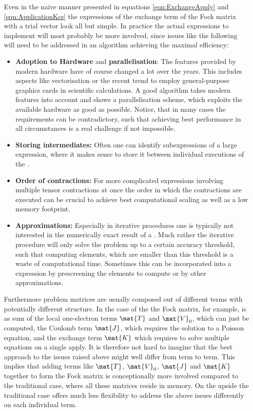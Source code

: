 Even in the naive manner presented
in equations \eqref{eqn:ExchangeApply} and \eqref{eqn:ApplicationKcs}
the \contraction expressions
of the exchange term of the Fock matrix with a trial vector
look all but simple.
In practice the actual expressions to implement
will most probably be more involved,
since issues like the following will need to be addressed
in an algorithm achieving the maximal efficiency:
\begin{itemize}
	\item \textbf{Adoption to Hardware} and \textbf{parallelisation}:
		The features provided by modern hardware
		have of course changed a lot over the years.
		This includes aspects like vectorisation
		or the recent trend to employ general-purpose graphics cards
		in scientific calculations.
		A good algorithm takes modern features into account
		and shows a parallelisation scheme,
		which exploits the available hardware as good as possible.
		Notice, that in many cases the requirements
		can be contradictory,
		such that achieving best performance in all circumstances
		is a real challenge if not impossible.
	\item \textbf{Storing intermediates:}
		Often one can identify subexpressions
		of a large \contraction expression,
		where it makes sense to store it between individual
		executions of the \contraction.
	\item \textbf{Order of contractions:}
		For more complicated expressions involving
		multiple tensor contractions at once the order
		in which the contractions are executed can be crucial
		to achieve best computational scaling
		as well as a low memory footprint.
	\item \textbf{Approximations:}
		Especially in iterative procedures one is typically not
		interested in the numerically exact result
		of a \contraction.
		Much rather the iterative procedure will only solve
		the problem up to a certain accuracy threshold,
		such that computing elements,
		which are smaller than this threshold is a waste of computational time.
		Sometimes this can be incorporated into a \contraction expression
		by prescreening the elements to compute or by other approximations.
\end{itemize}
Furthermore problem matrices
are usually composed out of different terms
with potentially different structure.
In the case of the \SCF the Fock matrix, for example,
is as sum of the local one-electron terms $\mat{T}$ and $\mat{V}_0$,
which can just be computed,
the Coulomb term $\mat{J}$,
which requires the solution to a Poisson equation,
and the exchange term $\mat{K}$ which requires to solve
multiple equations on a single apply.
It is therefore not hard to imagine
that the best approach to the issues raised above might
well differ from term to term.
This implies that adding terms like $\mat{T}$, $\mat{V}_0$, $\mat{J}$
and $\mat{K}$ together to form the Fock matrix is conceptionally
more involved compared to the traditional case,
where all these matrices reside in memory.
On the upside the traditional case offers much less flexibility
to address the above issues differently on each individual term.

